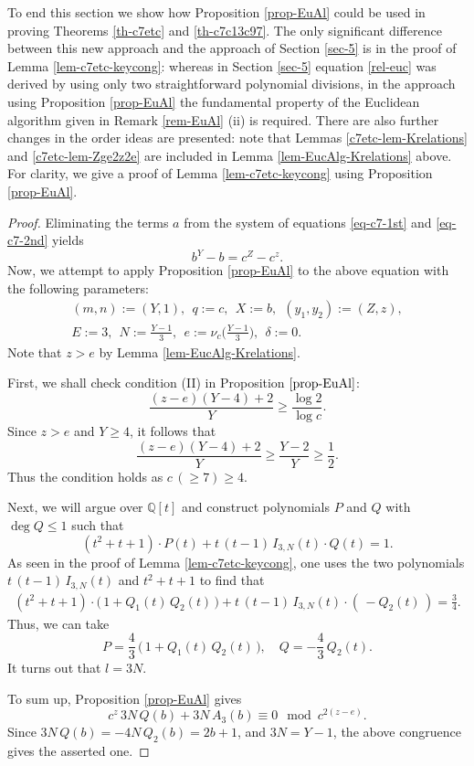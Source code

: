 \documentclass[11pt]{amsart}
\numberwithin{equation}{section}
\begin{document}
To end this section we show how Proposition \ref{prop-EuAl} could be used in proving Theorems \ref{th-c7etc} and \ref{th-c7c13c97}.  The only significant difference between this new approach and the approach of Section \ref{sec-5} is in the proof of Lemma \ref{lem-c7etc-keycong}: whereas in Section \ref{sec-5} equation \eqref{rel-euc} was derived by using only two straightforward polynomial divisions, in the approach using Proposition \ref{prop-EuAl} the fundamental property of the Euclidean algorithm given in Remark \ref{rem-EuAl} (ii) is required.  There are also further changes in the order ideas are presented: note that Lemmas \ref{c7etc-lem-Krelations} and \ref{c7etc-lem-Zge2z2e} are included in Lemma \ref{lem-EucAlg-Krelations} above. 
For clarity, we give a proof of Lemma \ref{lem-c7etc-keycong} using Proposition \ref{prop-EuAl}.

\begin{proof}
Eliminating the terms $a$ from the system of equations \eqref{eq-c7-1st} and \eqref{eq-c7-2nd} yields
\[
b^Y-b=c^Z-c^z.
\]
Now, we attempt to apply Proposition \ref{prop-EuAl} to the above equation with the following parameters:
\begin{gather*}
(m,n):=(Y,1), \ \ q:=c, \ \ X:=b, \ \ (y_1,y_2):=(Z,z), \\ 
E:=3, \ \ N:=\frac{Y-1}{3}, \ \ e:=\nu_{c}\bigg(\frac{Y-1}{3}\bigg), \ \ \delta:=0.
\end{gather*}
Note that $z>e$ by Lemma \ref{lem-EucAlg-Krelations}.

First, we shall check condition (II) in Proposition $\ref{prop-EuAl}$:%
\[
\frac{(z-e)(Y-4)+2}{Y} \ge \frac{\log 2}{\log c}.
\]
Since $z>e$ and $Y \ge 4$, it follows that
\[
\frac{(z-e)(Y-4)+2}{Y} \ge 
\frac{Y-2}{Y} \ge \frac{1}{2}.
\]
Thus the condition holds as $c\,( \ge 7) \ge 4$.

Next, we will argue over $\mathbb Q[t]$ and construct polynomials $P$ and $Q$ with $\deg Q \le 1$ such that
\[
(t^2+t+1) \cdot P(t) + t\,(t-1)\,I_{3,N}(t) \cdot Q(t)=1.
\]
As seen in the proof of Lemma \ref{lem-c7etc-keycong}, one uses the two polynomials $t\,(t-1)\,I_{3,N}(t)$ and $t^2+t+1$ to find that
\begin{align*}\label{eq-EuAl-c7etc}
(t^2+t+1) \cdot \big(\,1+Q_1(t)\,Q_2(t)\,\big)
+t\,(t-1)\,I_{3,N}(t) \cdot (\,-Q_2(t)\,)
=\frac{3}{4}.\nonumber
\end{align*}
Thus, we can take 
\[
P=\frac{4}{3}\,\bigr(\,1+Q_1(t)\,Q_2(t)\,\big), \quad 
Q=-\frac{4}{3}\,Q_2(t).
\]
It turns out that $l=3N$.

To sum up, Proposition \ref{prop-EuAl} gives
\[
c^z\,3N\,Q(b)+3N\,A_3(b) \equiv 0 \mod{c^{2(z-e)}}.
\]
Since $3N\,Q(b)=-4N\,Q_2(b)=2b+1$, and $3N=Y-1$, the above congruence gives the asserted one.
\end{proof}
\end{document}
